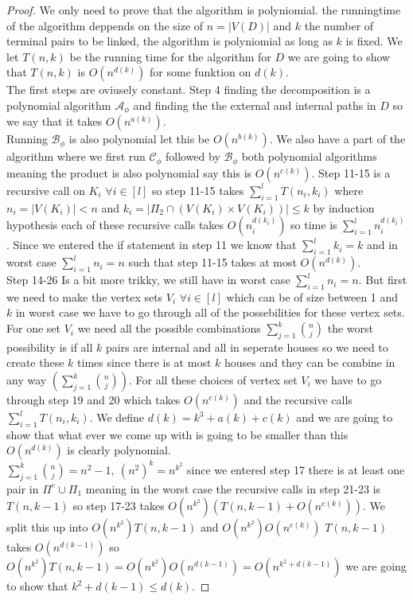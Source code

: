 \begin{proof}
    We only need to prove that the algorithm is polyniomial.
    the runningtime of the algorithm deppends on the size of $n=|V(D)|$ and $k$ the number of terminal pairs to be linked, the algorithm is polyniomial as long as $k$ is fixed.
    We let $T(n,k)$ be the running time for the algorithm for $D$ we are going to show that $T(n,k)$ is $O(n^{d(k)})$ for some funktion on $d(k)$.\\
    The first steps are oviusely constant. 
    Step 4 finding the decomposition is a polynomial algorithm $\mathcal{A}_\phi$ and finding the the external and internal paths in $D$ so we say that it takes $O(n^{a(k)})$.\\
    Running $\mathcal{B}_\phi$ is also polynomial let this be $O(n^{b(k)})$.
    We also have a part of the algorithm where we first run $\mathcal{C}_\phi$ followed by $\mathcal{B}_\phi$ both polynomial algorithms meaning the product is also polynomial say this is $O(n^{c(k)})$.
    Step 11-15 is a recursive call on $K_i$ $\forall i\in[l]$
    so step 11-15 takes $\sum_{i=1}^lT(n_i,k_i)$ where $n_i=|V(K_i)|<n$ and $k_i=|\Pi_2\cap (V(K_i)\times V(K_i))|\leq k$ by induction hypothesis each of these recursive calls takes $O(n_i^{d(k_i)})$ so time is $\sum_{i=1}^ln_i^{d(k_i)}$.
    Since we entered the if statement in step 11 we know that $\sum_{i=1}^lk_i=k$ and in worst case $\sum_{i=1}^ln_i=n$ such that step 11-15 takes at most $O(n^{d(k)})$.\\
    Step 14-26 Is a bit more trikky, we still have in worst case $\sum_{i=1}^ln_i=n$. 
    But first we need to make the vertex sets $V_i$ $\forall i\in [l]$ which can be of size between 1 and $k$ in worst case we have to go through all of the possebilities for these vertex sets.
    For one set $V_i$ we need all the possible combinations $\sum_{j=1}^k{{n}\choose{j}}$ the worst possibility is if all $k$ pairs are internal and all in seperate houses so we need to create these $k$ times since there is at most $k$ houses and they can be combine in any way $\left(\sum_{j=1}^k{{n}\choose{j}}\right)$. 
    For all these choices of vertex set $V_i$ we have to go through step 19 and 20 which takes $O(n^{c(k)})$ and the recursive calls $\sum_{i=1}^l T(n_i,k_i)$.
    We define $d(k)=k^3+a(k)+c(k)$ and we are going to show that what ever we come up with is going to be smaller than this $O(n^{d(k)})$ is clearly polynomial. \\
    $\sum_{j=1}^k{{n}\choose {j}}=n^2-1,\ (n^2)^k=n^{k^2}$ since we entered step 17 there is at least one pair in $\Pi^e\cup \Pi_1$ meaning in the worst case the recursive calls in step 21-23 is $T(n,k-1)$ so step 17-23 takes $O(n^{k^2})(T(n,k-1)+O(n^{c(k)}))$. We split this up into $O(n^{k^2})T(n,k-1)$ and $O(n^{k^2})O(n^{c(k)})$ 
    $T(n,k-1)$ takes $O(n^{d(k-1)})$ so $O(n^{k^2})T(n,k-1)=O(n^{k^2})O(n^{d(k-1)})=O(n^{k^2+d(k-1)})$ we are going to show that $k^2+d(k-1)\leq d(k)$.


\end{proof}
